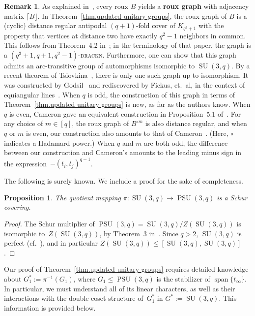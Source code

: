 \documentclass[11pt]{article}
\newtheorem{proposition}[theo]{Proposition}
\theoremstyle{definition}
\newtheorem{remark}[theo]{Remark}
\numberwithin{equation}{section}
\begin{document}
\begin{remark}
As explained in~\cite{IversonM:18}, every roux $B$ yields a \textbf{roux graph} with adjacency matrix $\lceil B \rfloor$.
In Theorem~\ref{thm.updated unitary groups}, the roux graph of $B$ is a (cyclic) distance regular antipodal $(q+1)$-fold cover of $K_{q^3+1}$ with the property that vertices at distance two have exactly $q^2-1$ neighbors in common.
This follows from Theorem~4.2 in~\cite{IversonM:18}; in the terminology of that paper, the graph is a $(q^3+1,q+1,q^2-1)$-\textsc{drackn}.
Furthermore, one can show that this graph admits an arc-transitive group of automorphisms isomorphic to $\operatorname{SU}(3,q)$.
By a recent theorem of Tsiovkina~\cite[Theorem~5.11]{Tsiovkina:22}, there is only one such graph up to isomorphism.
It was constructed by Godsil~\cite{Godsil:92} and rediscovered by Fickus, et.~al, in the context of equiangular lines~\cite{FickusJMPW:17}.
When $q$ is odd, the construction of this graph in terms of Theorem~\ref{thm.updated unitary groups} is new, as far as the authors know.
When $q$ is even, Cameron gave an equivalent construction in Proposition~5.1 of~\cite{Cameron:91}.
For any choice of $m \in [q]$, the roux graph of $B^{\circ m}$ is also distance regular, and when $q$ or $m$ is even, our construction also amounts to that of Cameron~\cite{Cameron:91}.
(Here, $\circ$ indicates a Hadamard power.)
When $q$ and $m$ are both odd, the difference between our construction and Cameron's amounts to the leading minus sign in the expression~$-(t_i,t_j)^{q-1}$.
\end{remark}


The following is surely known.
We include a proof for the sake of completeness.

\begin{proposition}
The quotient mapping $\pi \colon \operatorname{SU}(3,q) \to \operatorname{PSU}(3,q)$ is a Schur covering.
\end{proposition}

\begin{proof}
The Schur multiplier of $\operatorname{PSU}(3,q) = \operatorname{SU}(3,q)/Z(\operatorname{SU}(3,q))$ is isomorphic to~$Z(\operatorname{SU}(3,q))$, by Theorem~3 in~\cite{Griess:73}.
Since $q > 2$, $\operatorname{SU}(3,q)$ is perfect (cf.~\cite[Theorem~11.22]{Grove:02}), and in particular $Z(\operatorname{SU}(3,q)) \leq [\operatorname{SU}(3,q),\operatorname{SU}(3,q)]$.
\end{proof}

Our proof of Theorem~\ref{thm.updated unitary groups} requires detailed knowledge about $G_1^* := \pi^{-1}(G_1)$, where $G_1 \leq \operatorname{PSU}(3,q)$ is the stabilizer of $\operatorname{span}\{ t_\infty \}$.
In particular, we must understand all of its linear characters, as well as their interactions with the double coset structure of~$G_1^*$ in $G^*:= \operatorname{SU}(3,q)$.
This information is provided below.
\end{document}
